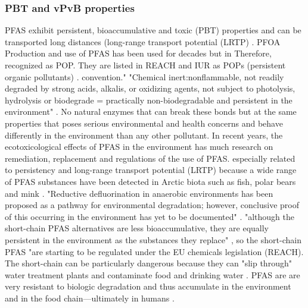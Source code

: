 \subsubsection{PBT and vPvB properties}
PFAS exhibit persistent, bioaccumulative and toxic (PBT) properties and can be transported long distances (long-range transport potential (LRTP) \citep{EC2020PFAS,MD2016workshop}. PFOA Production and use of PFAS has been used for decades but in  Therefore, recognized as POP.  They are listed in REACH and IUR as POPs (persistent organic pollutants) \citep{Schlabach2017}.   
convention." \citep{Schlabach2017} "Chemical inert:nonflammable, not readily degraded by strong acids, alkalis, or oxidizing agents, not subject to photolysis, hydrolysis or biodegrade  = practically non-biodegradable and persistent in the environment" \citep{Lau2007,EPA2014}. No natural enzymes that can break these bonds
but at the same properties that poses serious environmental and health concerns and behave differently in the environment than any other pollutant. In recent years, the ecotoxicological effects of PFAS in the environment has much research on remediation, replacement and regulations of the use of PFAS. especially related to persistency and long-range transport potential (LRTP) \citep{MD2020EQS} because a wide range of PFAS substances have been detected in Arctic biota such as fish, polar bears and mink \citep{Schlabach2017}. 
"Reductive defluorination in anaerobic environments has been proposed as a pathway for environmental degradation; however, conclusive proof of this occurring in the environment has yet to be documented" \citep{ArpNGI}.
"although the short-chain PFAS alternatives are less bioaccumulative, they are equally persistent in the environment as the substances they replace" \citep{ECHA2020}, so the short-chain PFAS "are starting to be regulated under the EU chemicals legislation (REACH). The short-chain can be particularly dangerous because they can "slip through" water treatment plants and contaminate food and drinking water \citep{Reemtsma2016}. PFAS are are very resistant to biologic degradation and thus accumulate in the environment and in the food chain---ultimately in humans \citep{Schlabach2017,Steenland2010,Lau2007}. 



